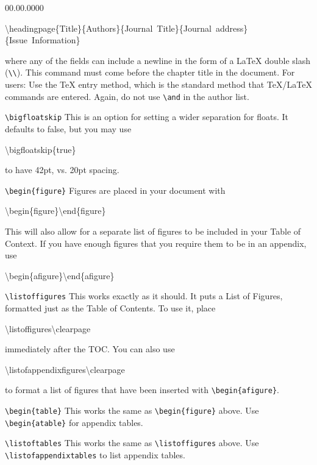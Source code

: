 \begin{lyxlist}{00.00.0000}
\begin{lyxcode}
\textbackslash{}headingpage\{Title\}\{Authors\}\{Journal~Title\}\{Journal~address\}~\\
\{Issue~Information\}
\end{lyxcode}
where any of the fields can include a newline in the form of a \LaTeX{}
double slash (\texttt{\textbackslash{}\textbackslash{}}). This command
must come before the chapter title in the document. For \LyX{} users:
Use the \TeX{} entry method, which is the standard method that \TeX{}/\LaTeX{}
commands are entered. Again, do not use \texttt{\textbackslash{}and}
in the author list. 

\item [\texttt{\textbackslash{}bigfloatskip}]This is an option for setting
a wider separation for floats. It defaults to false, but you may use

\begin{lyxcode}
\textbackslash{}bigfloatskip\{true\}
\end{lyxcode}
to have 42pt, vs. 20pt spacing.

\item [\texttt{\textbackslash{}begin\{figure\}}]Figures are placed in your
document with

\begin{lyxcode}
\textbackslash{}begin\{figure\}\textbackslash{}end\{figure\}~
\end{lyxcode}
This will also allow for a separate list of figures to be included
in your Table of Context. If you have enough figures that you require
them to be in an appendix, use

\begin{lyxcode}
\textbackslash{}begin\{afigure\}\textbackslash{}end\{afigure\}
\end{lyxcode}
\item [\texttt{\textbackslash{}listoffigures}]This works exactly as it
should. It puts a List of Figures, formatted just as the Table of
Contents. To use it, place

\begin{lyxcode}
\textbackslash{}listoffigures\textbackslash{}clearpage
\end{lyxcode}
immediately after the TOC. You can also use

\begin{lyxcode}
\textbackslash{}listofappendixfigures\textbackslash{}clearpage
\end{lyxcode}
to format a list of figures that have been inserted with \texttt{\textbackslash{}begin\{afigure\}}.

\item [\texttt{\textbackslash{}begin\{table\}}]This works the same as \texttt{\textbackslash{}begin\{figure\}}
above. Use \texttt{\textbackslash{}begin\{atable\}} for appendix tables.
\item [\texttt{\textbackslash{}listoftables}]This works the same as \texttt{\textbackslash{}listoffigures}
above. Use \texttt{\textbackslash{}listofappendixtables} to list appendix
tables.
\end{lyxlist}

